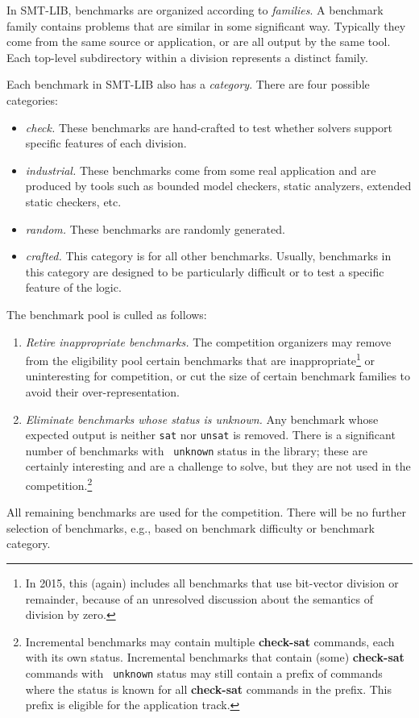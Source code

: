 \documentclass[12pt]{article}
\newcommand{\akey}[1]{\textbf{#1}}
\begin{document}
%
In SMT-LIB, benchmarks are organized according to \emph{families}.  A
benchmark family contains problems that are similar in some
significant way.  Typically they come from the same source or
application, or are all output by the same tool.  Each top-level
subdirectory within a division represents a distinct family.

Each benchmark in SMT-LIB also has a \emph{category}.  There are four
possible categories:
\begin{itemize}
\item \emph{check.} These benchmarks are hand-crafted to test whether
  solvers support specific features of each division.
\item \emph{industrial.} These benchmarks come from some real
  application and are produced by tools such as bounded model
  checkers, static analyzers, extended static checkers, etc.
\item \emph{random.} These benchmarks are randomly generated.
\item \emph{crafted.} This category is for all other benchmarks.
  Usually, benchmarks in this category are designed to be particularly
  difficult or to test a specific feature of the logic.
\end{itemize}

%
The benchmark pool is culled as follows:
\begin{enumerate}
\item \emph{Retire inappropriate benchmarks.} The competition
  organizers may remove from the eligibility pool certain benchmarks
  that are inappropriate\footnote{In 2015, this (again) includes all
    benchmarks that use bit-vector division or remainder, because of
    an unresolved discussion about the semantics of division by zero.}
  or uninteresting for competition, or cut the size of certain
  benchmark families to avoid their over-representation.
\item \emph{Eliminate benchmarks whose status is unknown.} Any
  benchmark whose expected output is neither {\tt sat} nor {\tt unsat}
  is removed.  There is a significant number of benchmarks with {\tt
    unknown} status in the library; these are certainly interesting
  and are a challenge to solve, but they are not used in the
  competition.\footnote{Incremental benchmarks may contain multiple
    \akey{check-sat} commands, each with its own status.  Incremental
    benchmarks that contain (some) \akey{check-sat} commands with {\tt
      unknown} status may still contain a prefix of commands where the
    status is known for all \akey{check-sat} commands in the prefix.
    This prefix is eligible for the application track.}
\end{enumerate}
%
All remaining benchmarks are used for the competition.  There will be
no further selection of benchmarks, e.g., based on benchmark
difficulty or benchmark category.
\end{document}
